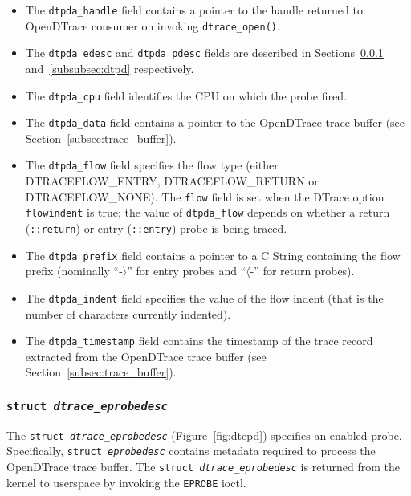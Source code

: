 \begin{itemize}

	\item The \texttt{dtpda\_handle} field contains a pointer to the handle
returned to OpenDTrace consumer on invoking \texttt{dtrace\_open()}.

	\item The \texttt{dtpda\_edesc} and \texttt{dtpda\_pdesc} fields are
described in Sections~\ref{subsubsec:dtepd} and~\ref{subsubsec:dtpd}
respectively.

	\item The \texttt{dtpda\_cpu} field identifies the CPU on which the
probe fired.

	\item The \texttt{dtpda\_data} field contains a pointer to the OpenDTrace
trace buffer (see Section~\ref{subsec:trace_buffer}).

	\item The \texttt{dtpda\_flow} field specifies the flow type (either
DTRACEFLOW\_ENTRY, DTRACEFLOW\_RETURN or DTRACEFLOW\_NONE). The \texttt{flow}
field is set when the DTrace option \texttt{flowindent} is true; the value of
\texttt{dtpda\_flow} depends on whether a return (\texttt{::return}) or entry
(\texttt{::entry}) probe is being traced.

	\item The \texttt{dtpda\_prefix} field contains a pointer to a C String
containing the flow prefix (nominally ``-$\rangle$'' for entry probes and
``$\langle$-'' for return probes).

	\item The \texttt{dtpda\_indent} field specifies the value of the flow
indent (that is the number of characters currently indented).

	\item The \texttt{dtpda\_timestamp} field contains the timestamp of the
trace record extracted from the OpenDTrace trace buffer (see
Section~\ref{subsec:trace_buffer}).

\end{itemize}

\subsubsection{\texttt{struct \textit{dtrace\_eprobedesc}}}
\label{subsubsec:dtepd}

The \texttt{struct~\textit{dtrace\_eprobedesc}}
(Figure~\ref{fig:dtepd}) specifies an enabled probe. Specifically,
\texttt{struct~\textit{eprobedesc}} contains metadata required to
process the OpenDTrace trace buffer. The
\texttt{struct~\textit{dtrace\_eprobedesc}} is returned from the
kernel to userspace by invoking the \texttt{EPROBE} ioctl.

